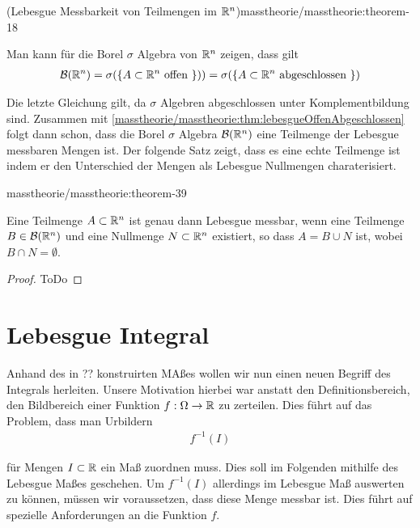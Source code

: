 \begin{theorem}{(Lebesgue Messbarkeit von Teilmengen im \protect\(\mathbb{R}^n\protect\))}{masstheorie/masstheorie:theorem-18}
\par
Man kann für die Borel \(\sigma\) Algebra von \(\mathbb{R}^n\) zeigen, dass gilt
\begin{align*}
\mathcal{B}(\mathbb{R}^n) = \sigma(\lbrace A \subset \mathbb{R}^n \text{ offen }\rbrace) ) = \sigma(\lbrace A \subset \mathbb{R}^n \text{ abgeschlossen }\rbrace)
\end{align*}
\par
Die letzte Gleichung gilt, da \(\sigma\) Algebren abgeschlossen unter Komplementbildung sind.
Zusammen mit \cref{masstheorie/masstheorie:thm:lebesgueOffenAbgeschlossen} folgt dann schon, dass die Borel \(\sigma\) Algebra \(\mathcal{B}(\mathbb{R}^n)\) eine Teilmenge der Lebesgue messbaren Mengen ist.
Der folgende Satz zeigt, dass es eine echte Teilmenge ist indem er den Unterschied der Mengen als Lebesgue Nullmengen charaterisiert.
\begin{theorem}{}{masstheorie/masstheorie:theorem-39}



\par
Eine Teilmenge \(A \subset \mathbb{R}^n\) ist genau dann Lebesgue messbar, wenn eine Teilmenge \(B \in \mathcal{B}(\mathbb{R}^n)\) und eine Nullmenge \(N \subset \mathbb{R}^n\) existiert, so dass \(A = B \cup N\) ist, wobei \(B\cap N=\emptyset\).
\end{theorem}

\begin{proof}
 ToDo
\end{proof}


\section{Lebesgue Integral}
\label{\detokenize{masstheorie/lebesgue_integral:lebesgue-integral}}\label{\detokenize{masstheorie/lebesgue_integral::doc}}
\par
Anhand des in ?? konstruirten MAßes wollen wir nun einen neuen Begriff des Integrals herleiten. Unsere Motivation hierbei war anstatt den Definitionsbereich, den Bildbereich einer Funktion \(f:\Omega\to\mathbb{R}\) zu zerteilen. Dies führt auf das Problem, dass man Urbildern
\begin{align*}
f^{-1}(I)
\end{align*}
\par
für Mengen \(I\subset\mathbb{R}\) ein Maß zuordnen muss. Dies soll im Folgenden mithilfe des Lebesgue Maßes geschehen. Um \(f^{-1}(I)\) allerdings im Lebesgue Maß auswerten zu können, müssen wir voraussetzen, dass diese Menge messbar ist. Dies führt auf spezielle Anforderungen an die Funktion \(f\).



\end{theorem}
